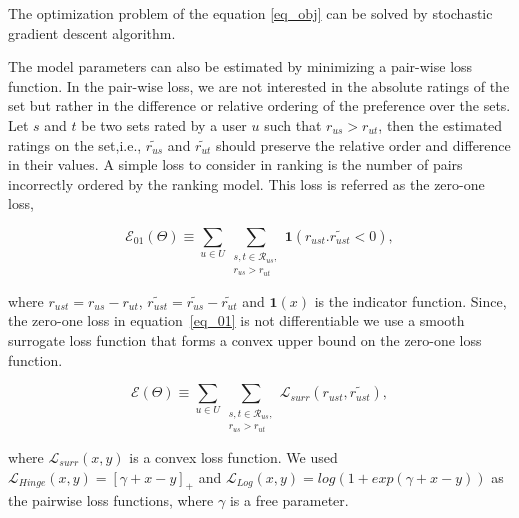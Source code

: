 
The optimization problem of the equation \ref{eq_obj} can be solved by stochastic
gradient descent algorithm.

The model parameters can also be estimated by minimizing a pair-wise loss
function. In the pair-wise loss, we are not interested in the absolute ratings
of the set but rather in the difference or relative ordering of the preference
over the sets. Let $s$ and $t$ be two sets rated by a user $u$ such that $r_{us}
> r_{ut}$, then the estimated ratings on the set,i.e., $\tilde{r_{us}}$ and
$\tilde{r_{ut}}$ should preserve the relative order and difference in their
values. A simple loss to consider in ranking is the number of pairs incorrectly 
ordered by the ranking model. This loss is referred as the zero-one loss,

\begin{equation} \label{eq_01}
  \mathcal{E}_{01}(\Theta) \equiv \sum_{u \in U} \sum_{\substack{s,t \in
\mathcal{R}_{us},\\ r_{us} > r_{ut}}} \bm{1}(r_{ust} . \tilde{r_{ust}} < 0),
\end{equation}

\noindent where $r_{ust} = r_{us} - r_{ut}$, $\tilde{r_{ust}} = \tilde{r_{us}} -
\tilde{r_{ut}}$ and $\bm{1}(x)$ is the indicator function. Since, the zero-one
loss in equation~\ref{eq_01} is not differentiable we use a smooth surrogate
loss function that forms a convex upper bound on the zero-one loss function.


\begin{equation} \label{eq_smooth}
  \mathcal{E}(\Theta) \equiv \sum_{u \in U} \sum_{\substack{s,t \in
  \mathcal{R}_{us},\\ r_{us} > r_{ut}}} \mathcal{L}_{surr}(r_{ust}, \tilde{r_{ust}}),
\end{equation}

\noindent where $\mathcal{L}_{surr}(x,y)$ is a convex loss function. We used
$\mathcal{L}_{Hinge}(x,y)=[\gamma + x - y]_+$ and $\mathcal{L}_{Log}(x,y) =
log(1+exp(\gamma + x - y))$ as the pairwise loss functions, where $\gamma$ is a
free parameter.



